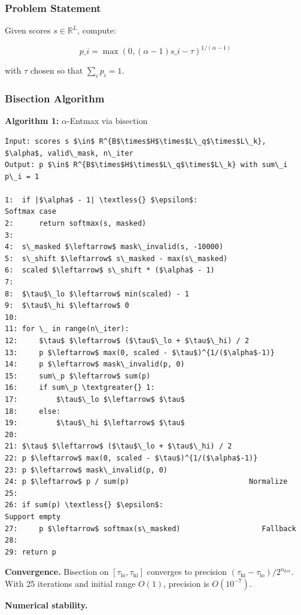 \subsubsection{Problem Statement}

Given scores $s \in \mathbb{R}^{L}$, compute:

\[
p\_i = \max(0, (\alpha - 1) s\_i - \tau)^{1/(\alpha - 1)}
\tag{4.1}
\]

with $\tau$ chosen so that $\sum_i p_i = 1$.

\subsubsection{Bisection Algorithm}

\textbf{Algorithm 1:} $\alpha$-Entmax via bisection
\begin{lstlisting}
Input: scores s $\in$ R^{B$\times$H$\times$L\_q$\times$L\_k}, $\alpha$, valid\_mask, n\_iter
Output: p $\in$ R^{B$\times$H$\times$L\_q$\times$L\_k} with sum\_i p\_i = 1

1:  if |$\alpha$ - 1| \textless{} $\epsilon$:                          Softmax case
2:      return softmax(s, masked)
3:
4:  s\_masked $\leftarrow$ mask\_invalid(s, -10000)
5:  s\_shift $\leftarrow$ s\_masked - max(s\_masked)
6:  scaled $\leftarrow$ s\_shift * ($\alpha$ - 1)
7:
8:  $\tau$\_lo $\leftarrow$ min(scaled) - 1
9:  $\tau$\_hi $\leftarrow$ 0
10:
11: for \_ in range(n\_iter):
12:     $\tau$ $\leftarrow$ ($\tau$\_lo + $\tau$\_hi) / 2
13:     p $\leftarrow$ max(0, scaled - $\tau$)^{1/($\alpha$-1)}
14:     p $\leftarrow$ mask\_invalid(p, 0)
15:     sum\_p $\leftarrow$ sum(p)
16:     if sum\_p \textgreater{} 1:
17:         $\tau$\_lo $\leftarrow$ $\tau$
18:     else:
19:         $\tau$\_hi $\leftarrow$ $\tau$
20:
21: $\tau$ $\leftarrow$ ($\tau$\_lo + $\tau$\_hi) / 2
22: p $\leftarrow$ max(0, scaled - $\tau$)^{1/($\alpha$-1)}
23: p $\leftarrow$ mask\_invalid(p, 0)
24: p $\leftarrow$ p / sum(p)                            Normalize
25:
26: if sum(p) \textless{} $\epsilon$:                             Support empty
27:     p $\leftarrow$ softmax(s\_masked)                   Fallback
28:
29: return p
\end{lstlisting}

\textbf{Convergence.} Bisection on $[\tau_\text{lo}, \tau_\text{hi}]$ converges 
to precision $(\tau_\text{hi} - \tau_\text{lo}) / 2^{n_\text{iter}}$. With 
25 iterations and initial range $O(1)$, precision is $O(10^{-7})$.

\textbf{Numerical stability.}

